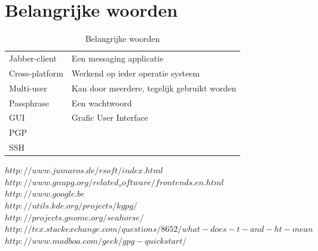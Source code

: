 \documentclass[12pt]{article}
\begin{document}
		\section{Belangrijke woorden}\label{Belangrijke woorden}
			\begin{table}[!ht]
				\begin{center}
					\begin{tabular}{l|l}
						Jabber-client		&	Een messaging applicatie\\ 
						Cross-platform		&	Werkend op ieder operatie systeem\\
						Multi-user			&	Kan door meerdere, tegelijk gebruikt worden\\
						Passphrase			&	Een wachtwoord\\
						GUI					&	Grafic User Interface\\
						PGP					&	\\
						SSH					&	\\
					\end{tabular}
				\end{center}
				\caption{Belangrijke woorden}
			\end{table}

		\newpage
		
			$http://www.jumaros.de/rsoft/index.html$ \\
			$http://www.gnupg.org/related_software/frontends.en.html$ \\
			$http://www.google.be$\\
			$http://utils.kde.org/projects/kgpg/$\\
			$http://projects.gnome.org/seahorse/$\\
			$http://tex.stackexchange.com/questions/8652/what-does-t-and-ht-mean$\\
			$http://www.madboa.com/geek/gpg-quickstart/$\\
			
			
\end{document}
